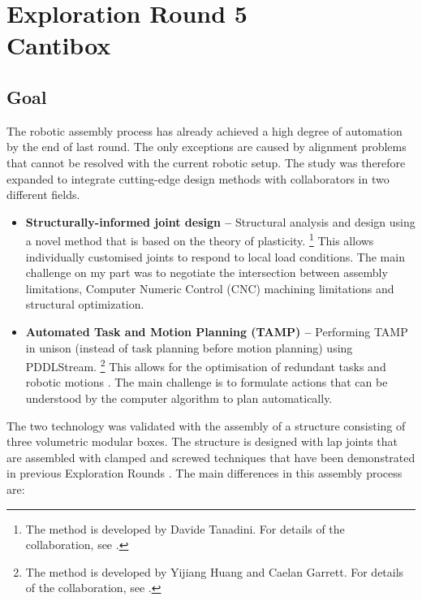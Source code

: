 \chapter[Exploration Round 5 - Cantibox]{Exploration Round 5\\Cantibox}
\label{chapter:exploration-round-5}

\section{Goal}
\label{section:exploration-5-goal}

The robotic assembly process has already achieved a high degree of automation by the end of last round. The only exceptions are caused by alignment problems that cannot be resolved with the current robotic setup. The study was therefore expanded to integrate cutting-edge design methods with collaborators in two different fields. 

\begin{itemize}
	\item \textbf{Structurally-informed joint design --} Structural analysis and design using a novel method that is based on the theory of plasticity.%
    \footnote{The method is developed by Davide Tanadini. For details of the collaboration, see .}
    This allows individually customised joints to respond to local load conditions. The main challenge on my part was to negotiate the intersection between assembly limitations, Computer Numeric Control (CNC) machining limitations and structural optimization. 

	\item \textbf{Automated Task and Motion Planning (TAMP) --} Performing TAMP in unison (instead of task planning before motion planning) using PDDLStream.%
    \footnote{The method is developed by Yijiang Huang and Caelan Garrett. For details of the collaboration, see .}
    This allows for the optimisation of redundant tasks and robotic motions . The main challenge is to formulate actions that can be understood by the computer algorithm to plan automatically. 

\end{itemize}
The two technology was validated with the assembly of a structure consisting of three volumetric modular boxes. The structure is designed with lap joints that are assembled with clamped and screwed techniques that have been demonstrated in previous Exploration Rounds . The main differences in this assembly process are:

